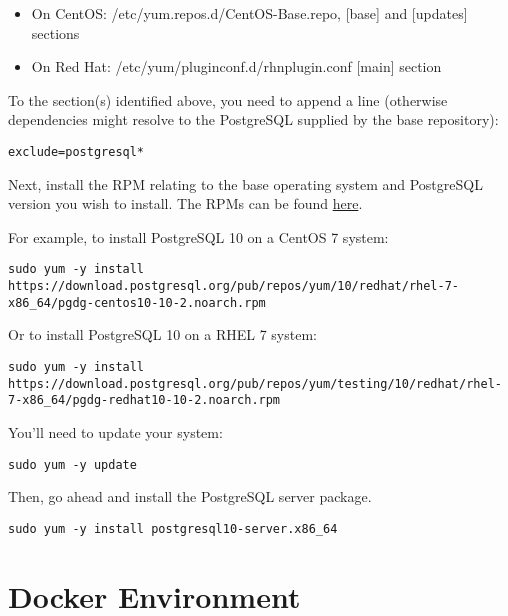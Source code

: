 \documentclass[letterpaper,12pt]{article}
\let\stdsection\section
\renewcommand\section{\newpage\stdsection}
\begin{document}
\begin{itemize}
    \item On CentOS: /etc/yum.repos.d/CentOS-Base.repo, [base] and [updates] sections 
    \item On Red Hat: /etc/yum/pluginconf.d/rhnplugin.conf [main] section 
\end{itemize}
To the section(s) identified above, you need to append a line (otherwise dependencies might resolve to the PostgreSQL supplied by the base repository):
\vspace{.75em}
\begin{lstlisting}
exclude=postgresql*
\end{lstlisting}

Next, install the RPM relating to the base operating system and PostgreSQL version you wish to install. The RPMs can be found \href{https://yum.postgresql.org/repopackages.php}{here}.

For example, to install PostgreSQL 10 on a CentOS 7 system:
\vspace{.75em}
\begin{lstlisting}
sudo yum -y install https://download.postgresql.org/pub/repos/yum/10/redhat/rhel-7-x86_64/pgdg-centos10-10-2.noarch.rpm
\end{lstlisting}

Or to install PostgreSQL 10 on a RHEL 7 system:
\vspace{.75em}
\begin{lstlisting}
sudo yum -y install https://download.postgresql.org/pub/repos/yum/testing/10/redhat/rhel-7-x86_64/pgdg-redhat10-10-2.noarch.rpm
\end{lstlisting}

You'll need to update your system:
\vspace{.75em}
\begin{lstlisting}
sudo yum -y update
\end{lstlisting}

Then, go ahead and install the PostgreSQL server package.
\vspace{.75em}
\begin{lstlisting}
sudo yum -y install postgresql10-server.x86_64
\end{lstlisting}

\section{Docker Environment}\label{/_docker_environment}
\end{document}
